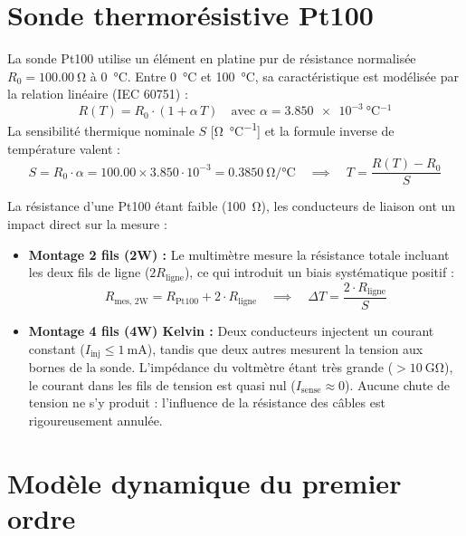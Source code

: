 \section{Sonde thermorésistive Pt100}
\label{sec:theorie_pt100}

La sonde Pt100 utilise un élément en platine pur de résistance normalisée $R_0 = \qty{100.00}{\ohm}$ à \qty{0}{\degreeCelsius}. Entre \qty{0}{\degreeCelsius} et \qty{100}{\degreeCelsius}, sa caractéristique est modélisée par la relation linéaire (IEC 60751) :
\begin{equation}
    R(T) = R_0 \cdot (1 + \alpha\,T) \quad \text{avec } \alpha = \qty{3.850e-3}{\degreeCelsius^{-1}}
    \label{eq:theorie_pt100_lineaire}
\end{equation}
La sensibilité thermique nominale $S$ [\unit{\ohm\per\degreeCelsius}] et la formule inverse de température valent :
\begin{equation}
    S = R_0 \cdot \alpha = 100.00 \times 3.850 \cdot 10^{-3} = \qty{0.3850}{\ohm\per\degreeCelsius} \quad \implies \quad T = \frac{R(T) - R_0}{S}
    \label{eq:theorie_sensibilite_pt100}
\end{equation}

La résistance d'une Pt100 étant faible (\qty{100}{\ohm}), les conducteurs de liaison ont un impact direct sur la mesure :
\begin{itemize}[leftmargin=1.2cm]
    \item \textbf{Montage 2 fils (2W) :} Le multimètre mesure la résistance totale incluant les deux fils de ligne ($2 R_{\text{ligne}}$), ce qui introduit un biais systématique positif :
    \begin{equation}
        R_{\text{mes, 2W}} = R_{\text{Pt100}} + 2 \cdot R_{\text{ligne}} \quad \implies \quad \Delta T = \frac{2 \cdot R_{\text{ligne}}}{S}
    \end{equation}
    \item \textbf{Montage 4 fils (4W) Kelvin :} Deux conducteurs injectent un courant constant ($I_{\text{inj}} \le \qty{1}{\milli\ampere}$), tandis que deux autres mesurent la tension aux bornes de la sonde. L'impédance du voltmètre étant très grande ($> \qty{10}{\giga\ohm}$), le courant dans les fils de tension est quasi nul ($I_{\text{sense}} \approx 0$). Aucune chute de tension ne s'y produit : l'influence de la résistance des câbles est rigoureusement annulée.
\end{itemize}

\section{Modèle dynamique du premier ordre}
\label{sec:theorie_dynamique}

